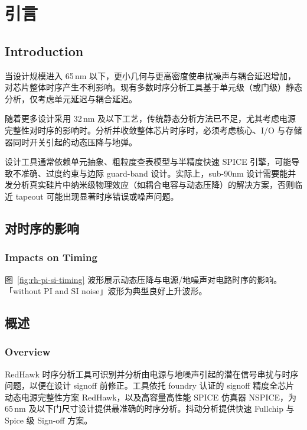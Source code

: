 ﻿%
\label{chap:noise}

\section{引言}
\subsection*{Introduction}

当设计规模进入 65\,nm 以下，更小几何与更高密度使串扰噪声与耦合延迟增加，对芯片整体时序产生不利影响。现有多数时序分析工具基于单元级（或门级）静态分析，仅考虑单元延迟与耦合延迟。

随着更多设计采用 32\,nm 及以下工艺，传统静态分析方法已不足，尤其考虑电源完整性对时序的影响时。分析并收敛整体芯片时序时，必须考虑核心、I/O 与存储器同时开关引起的动态压降与地弹。

设计工具通常依赖单元抽象、粗粒度查表模型与半精度快速 SPICE 引擎，可能导致不准确、过度约束与边际 guard-band 设计。实际上，sub-90nm 设计需要能并发分析真实硅片中纳米级物理效应（如耦合电容与动态压降）的解决方案，否则临近 tapeout 可能出现显著时序错误或噪声问题。

\subsection{对时序的影响}
\subsubsection*{Impacts on Timing}

图~\ref{fig:rh-pi-si-timing} 波形展示动态压降与电源/地噪声对电路时序的影响。「without PI and SI noise」波形为典型良好上升波形。

\label{fig:rh-pi-si-timing}

\subsection{概述}
\subsubsection*{Overview}

RedHawk 时序分析工具可识别并分析由电源与地噪声引起的潜在信号串扰与时序问题，以便在设计 signoff 前修正。工具依托 foundry 认证的 signoff 精度全芯片动态电源完整性方案 RedHawk，以及高容量高性能 SPICE 仿真器 NSPICE，为 65\,nm 及以下门尺寸设计提供最准确的时序分析。抖动分析提供快速 Fullchip 与 Spice 级 Sign-off 方案。

